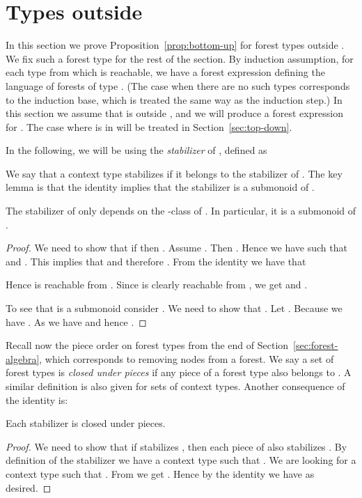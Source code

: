 \documentclass{LMCS}
\begin{document}
\section{Types  outside \texorpdfstring{}{Hbot}}\label{sec:induction-step}


In this section we prove Proposition~\ref{prop:bottom-up} for forest types outside . We fix such a forest type  for the rest of the section. By induction assumption, for each type  from
which  is reachable, we have a  forest expression defining the
language  of forests of type . (The case when there are no
such types  corresponds to the induction base, which is treated the
same way as the induction step.) In this section we assume that  is
outside , and we will produce a  forest expression
for . The case where  is in  will be treated in
Section~\ref{sec:top-down}.

In the following, we will be using the \emph{stabilizer} of ,
defined as

We say that a context type  stabilizes  if it belongs to the
stabilizer of .  The key lemma is that the  identity
implies that the stabilizer is a submonoid of .

\begin{lem}\label{lemma:closed-under-comp}
  The stabilizer of  only depends on the -class of . In
  particular, it is a  submonoid of .
\end{lem}
\begin{proof}
  We need to show that if  then
  . Assume . Then . Hence we have  such that  and
  . This implies that  and therefore
  . From the  identity we have that
  
  Hence  is reachable from . Since  is clearly reachable
from , we get   and .

To see that  is a submonoid consider . We need to
show that . Let . Because  we have . As  we have  and hence .
\end{proof}

Recall now the piece order on forest types from the end of
Section~\ref{sec:forest-algebra}, which corresponds to removing nodes
from a forest. We say a set  of forest types is
\emph{closed under pieces} if any piece of a forest type 
also belongs to . A similar definition is also given for sets of
context types. Another consequence of the  identity is:

\begin{lem}\label{lemma:closed-under-piece}
  Each stabilizer is closed under pieces.
\end{lem}
\begin{proof}
  We need to show that if  stabilizes , then each piece  of
   also stabilizes . By definition of the stabilizer we have a
  context type  such that . We are looking for a context type  such
  that . From  we get . Hence by the
   identity we have  as desired.
\end{proof}
\end{document}
